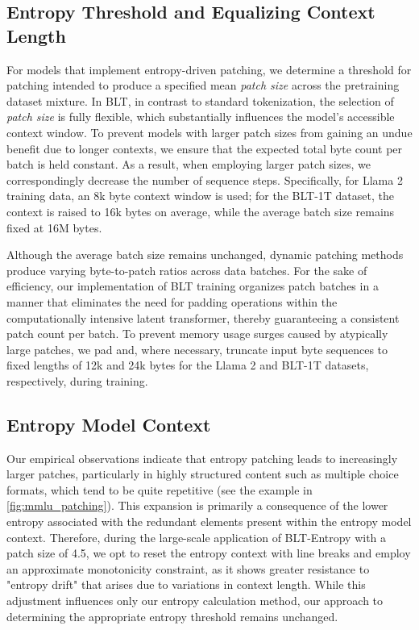 \subsection{Entropy Threshold and Equalizing Context Length} For models that implement entropy-driven patching, we determine a threshold for patching intended to produce a specified mean \textit{patch size} across the pretraining dataset mixture. In {\textsc BLT}, in contrast to standard tokenization, the selection of \textit{patch size} is fully flexible, which substantially influences the model's accessible context window. To prevent models with larger patch sizes from gaining an undue benefit due to longer contexts, we ensure that the expected total byte count per batch is held constant. As a result, when employing larger patch sizes, we correspondingly decrease the number of sequence steps. Specifically, for Llama 2 training data, an 8k byte context window is used; for the {\textsc BLT}-1T dataset, the context is raised to 16k bytes on average, while the average batch size remains fixed at 16M bytes.

Although the average batch size remains unchanged, dynamic patching methods produce varying byte-to-patch ratios across data batches. For the sake of efficiency, our implementation of {\textsc BLT} training organizes patch batches in a manner that eliminates the need for padding operations within the computationally intensive latent transformer, thereby guaranteeing a consistent patch count per batch. To prevent memory usage surges caused by atypically large patches, we pad and, where necessary, truncate input byte sequences to fixed lengths of 12k and 24k bytes for the Llama 2 and {\textsc BLT}-1T datasets, respectively, during training.

\subsection{Entropy Model Context}
\label{section:entropy-context}
Our empirical observations indicate that entropy patching leads to increasingly larger patches, particularly in highly structured content such as multiple choice formats, which tend to be quite repetitive (see the example in \autoref{fig:mmlu_patching}). This expansion is primarily a consequence of the lower entropy associated with the redundant elements present within the entropy model context. Therefore, during the large-scale application of {\textsc BLT}-Entropy with a patch size of 4.5, we opt to reset the entropy context with line breaks and employ an approximate monotonicity constraint, as it shows greater resistance to "entropy drift" that arises due to variations in context length. While this adjustment influences only our entropy calculation method, our approach to determining the appropriate entropy threshold remains unchanged.

